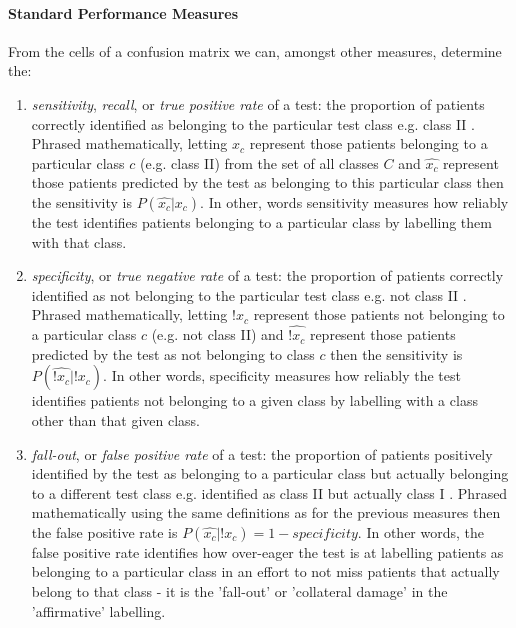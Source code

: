\documentclass[]{article}
\begin{document}
\paragraph{Standard Performance Measures}

From the cells of a confusion matrix we can, amongst other measures, determine the:
\begin{enumerate}[label=\alph*)]
	\item \textit{sensitivity}, \textit{recall}, or \textit{true positive rate} of a test: the proportion of patients correctly identified as belonging to the particular test class e.g. class II \cite{Flach2004,MedCalc2017,Gung2013,Sokolova2009,Forman2010,VanAsch2013}. Phrased mathematically, letting $x_c$ represent those patients belonging to a particular class $c$ (e.g. class II) from the set of all classes $C$ and $\hat{x_c}$ represent those patients predicted by the test as belonging to this particular class then the sensitivity is $P(\hat{x_c}|x_c)$. In other, words sensitivity measures how reliably the test identifies patients belonging to a particular class by labelling them with that class. 
	\item \textit{specificity}, or \textit{true negative rate} of a test: the proportion of patients correctly identified as not belonging to the particular test class e.g. not class II \cite{Flach2004,MedCalc2017,Gung2013,Sokolova2009,Forman2010,VanAsch2013}. Phrased mathematically, letting $!x_c$ represent those patients not belonging to a particular class $c$ (e.g. not class II) and $\hat{!x_c}$ represent those patients predicted by the test as not belonging to class $c$ then the sensitivity is $P(\hat{!x_c}|!x_c)$. In other words, specificity measures how reliably the test identifies patients not belonging to a given class by labelling with a class other than that given class.
	\item \textit{fall-out}, or \textit{false positive rate} of a test: the proportion of patients positively identified by the test as belonging to a particular class but actually belonging to a different test class e.g. identified as class II but actually class I \cite{Flach2004,MedCalc2017,Sokolova2009,Forman2010,VanAsch2013}. Phrased mathematically using the same definitions as for the previous measures then the false positive rate is $P(\hat{x_c}|!x_c) = 1 - \textit{specificity}$. In other words, the false positive rate identifies how over-eager the test is at labelling patients as belonging to a particular class in an effort to not miss patients that actually belong to that class - it is the 'fall-out' or 'collateral damage' in the 'affirmative' labelling.

\end{enumerate}
\end{document}
